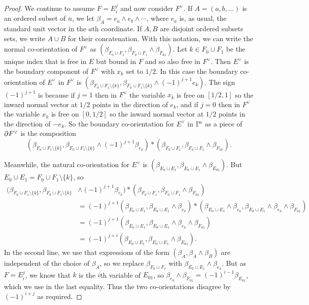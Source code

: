 \begin{proof}
	We continue to assume $F = E_i^j$ and now consider $F^\vee$.
	If $A=(a,b,\ldots)$ is an ordered subset of $\overline{n}$, we let $\beta_A = e_a \wedge e_b \wedge \cdots$, where $e_a$ is, as usual, the standard unit vector in the $a$th coordinate.
	If $A, B$ are disjoint ordered subsets sets, we write $A \cup B$ for their concatenation.
	With this notation, we can write the normal co-orientation of $F^\vee$ as $(\beta_{F_0 \cup F_1},\beta_{F_0 \cup F_1} \wedge \beta_{F_{01}})$.
	Let $k \in F_0 \cup F_1$ be the unique index that is free in $E$ but bound in $F$ and so also free in $F^\vee$.
	Then $E^\vee$ is the boundary component of $F^\vee$ with $x_k$ set to $1/2$.
	In this case the boundary co-orientation of $E^\vee$ in $F^\vee$ is $(\beta_{F_0 \cup F_1 \setminus \{k\}},\beta_{F_0 \cup F_1 \setminus \{k\}} \wedge (-1)^{j+1} e_k)$.
	The sign $(-1)^{j+1}$ is because if $j = 1$ then in $F^\vee$ the variable $x_k$ is free on $[1/2,1]$ so the inward normal vector at $1/2$ points in the direction of $e_k$, and if $j = 0$ then in $F^\vee$ the variable $x_k$ is free on $[0,1/2]$ so the inward normal vector at $1/2$ points in the direction of $-e_k$.
	So the boundary co-orientation for $E^\vee$ in $\mathbb{I}^n$ as a piece of $\partial F^\vee$ is the composition $$(\beta_{F_0 \cup F_1 \setminus \{k\}},\beta_{F_0 \cup F_1 \setminus \{k\}} \wedge (-1)^{j+1} \beta_{e_k})*(\beta_{F_0 \cup F_1},\beta_{F_0 \cup F_1} \wedge \beta_{F_{01}}).$$

	Meanwhile, the natural co-orientation for $E^\vee$ is $(\beta_{E_0 \cup E_1},\beta_{E_0 \cup E_1} \wedge \beta_{E_{01}}).$
	But $E_0 \cup E_1 = F_0 \cup F_1 \setminus \{k\}$, so
	\begin{align*}
		(\beta_{F_0 \cup F_1 \setminus \{k\}},\beta_{F_0 \cup F_1 \setminus \{k\}}& \wedge (-1)^{j+1} \beta_{e_k})*(\beta_{F_0 \cup F_1},\beta_{F_0 \cup F_1} \wedge \beta_{F_{01}})\\
		& = (-1)^{j+1}(\beta_{E_0 \cup E_1},\beta_{E_0 \cup E_1} \wedge \beta_{e_k})*(\beta_{E_0 \cup E_1} \wedge \beta_{e_k},\beta_{E_0 \cup E_1} \wedge \beta_{e_k} \wedge \beta_{F_{01}})\\
		& = (-1)^{j+1}(\beta_{E_0 \cup E_1},\beta_{E_0 \cup E_1} \wedge \beta_{e_k} \wedge \beta_{F_{01}})\\
		& = (-1)^{j+i}(\beta_{E_0 \cup E_1},\beta_{E_0 \cup E_1} \wedge \beta_{E_{01}}).
	\end{align*}
	In the second line, we use that expressions of the form $(\beta_A, \beta_A \wedge \beta_B)$ are independent of the choice of $\beta_A$, so we replace $\beta_{F_0 \cup F_1}$ with $\beta_{E_0 \cup E_1} \wedge \beta_{e_k}$.
	But as $F = E_i^j$, we know that $k$ is the $i$th variable of $E_{01}$, so
	$\beta_{e_k} \wedge \beta_{F_{01}} = (-1)^{i-1}\beta_{E_{01}}$, which we use in the last equality.
	Thus the two co-orientations disagree by $(-1)^{i+j}$ as required.
\end{proof}


